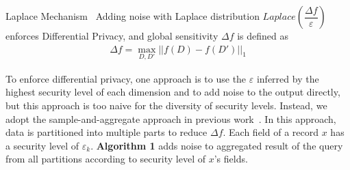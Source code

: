 


\begin{theorem}{Laplace Mechanism~\cite{Dwork2006Differential}}
  Adding noise with Laplace distribution $Laplace(\dfrac{\Delta 
f}{\varepsilon})$ enforces
  Differential Privacy, and global sensitivity $\Delta f$ is defined as
  \vspace{-.05in}
  \begin{align}
    \Delta f = \max\limits_{D, D'}|| f(D) - f(D') ||_1
  \end{align}
  \end{theorem}

To enforce differential privacy, one approach is to use the $\varepsilon$ 
inferred by the highest security level of each dimension and to add noise to 
the output directly, but this approach is too naive for the diversity of 
security levels. Instead, we adopt the sample-and-aggregate approach in 
previous work~\cite{differentialdp:stoc11}. In this approach, data is 
partitioned into multiple parts to reduce $\Delta f$. Each field of a record 
$x$ has a security level of $\varepsilon_k$. \textbf{Algorithm 1} adds noise to 
aggregated result of the query from all partitions according to security level 
of $x$'s fields. 

